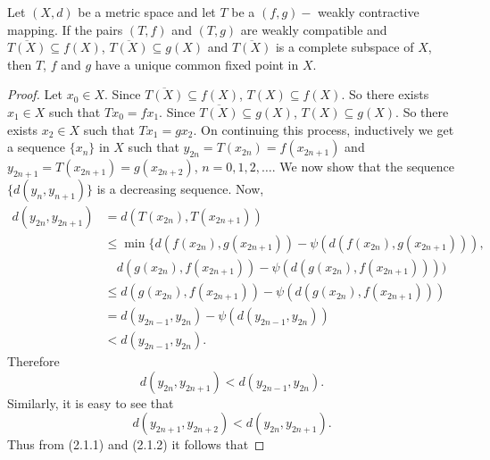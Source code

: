 \documentclass[10pt,a4paper]{amsart}
\begin{document}
\begin{theorem}
Let $(X,d)$ be a metric space and let $T$ be a $(f,g)-$ weakly contractive mapping. If the pairs $(T,f)$ and $(T,g)$ are weakly compatible and $\overline{T(X)}\subseteq f(X)$, $\overline{T(X)}\subseteq g(X)$ and $\overline{T(X)}$ is a complete subspace of $X$, then $T$, $f$ and $g$ have a unique common fixed point in $X$.
\end{theorem}

\begin{proof}
Let $x_{0}\in X.$ Since $\overline{T(X)}\subseteq f(X)$, $T(X)\subseteq f(X).$ So there exists $x_{1}\in X$ such that $Tx_{0}=fx_{1}.$
Since $\overline{T(X)}\subseteq g(X)$, $T(X)\subseteq g(X).$ So there exists $x_{2}\in X$ such that $Tx_{1}=gx_{2}.$
On continuing this process, inductively we get a sequence $\{x_{n}\}$ in $X$ such that $y_{2n}=T(x_{2n})=f(x_{2n+1})$ and $y_{2n+1}=T(x_{2n+1})=g(x_{2n+2})$, $n=0,1,2,\ldots.$
We now show that the sequence $\{d(y_{n},y_{n+1})\}$ is a decreasing sequence. Now,
\begin{align*}
d(y_{2n},y_{2n+1}) &= d(T(x_{2n}),T(x_{2n+1})) \\
&\leq \min\{d(f(x_{2n}),g(x_{2n+1}))-\psi(d(f(x_{2n}),g(x_{2n+1}))), \\
&\quad d(g(x_{2n}),f(x_{2n+1}))-\psi(d(g(x_{2n}),f(x_{2n+1})))) \\
&\leq d(g(x_{2n}),f(x_{2n+1}))-\psi(d(g(x_{2n}),f(x_{2n+1}))) \\
&= d(y_{2n-1},y_{2n})-\psi(d(y_{2n-1},y_{2n})) \\
&< d(y_{2n-1},y_{2n}).
\end{align*}
Therefore
\begin{equation}
d(y_{2n},y_{2n+1})<d(y_{2n-1},y_{2n}).
\end{equation}
Similarly, it is easy to see that
\begin{equation}
d(y_{2n+1},y_{2n+2})<d(y_{2n},y_{2n+1}).
\end{equation}
Thus from (2.1.1) and (2.1.2) it follows that


\end{proof}
\end{document}
